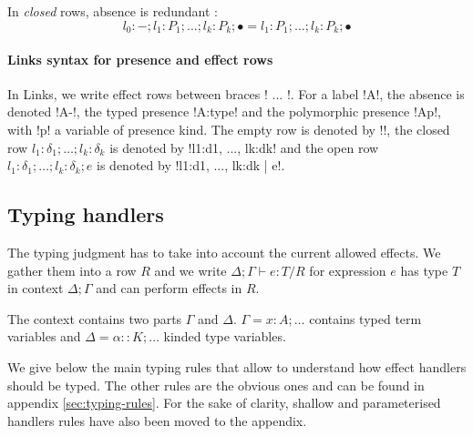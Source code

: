 \documentclass[11pt, nonacm=true, language=french, language=english]{acmart}
\begin{document}
\begin{rem}
  In \emph{closed} rows, absence is redundant :
  $$ l_{0}:- ; l_{1}:P_{1} ; \dots ; l_{k}:P_{k} ; \bullet = l_{1}:P_{1} ; \dots ; l_{k} : P_{k} ; \bullet $$
\end{rem}

\paragraph{Links syntax for presence and effect rows}
In Links, we write effect rows between braces !{ ... }!. For a label !A!, the absence is denoted !A-!, the typed presence !A:type! and the polymorphic presence !A{p}!, with !p! a variable of presence kind. The empty row is denoted by !{}!, the closed row $l_{1}:\delta_{1}; \dots; l_{k}:\delta_{k}$ is denoted by !{l1:d1, ..., lk:dk}! and the open row $l_{1}:\delta_{1}; \dots; l_{k}:\delta_{k}; e$ is denoted by !{l1:d1, ..., lk:dk | e}!.

\subsection{Typing handlers}
\label{sec:typing-handlers}

The typing judgment has to take into account the current allowed effects. We gather them into a row $R$ and we write $\Delta;\Gamma \vdash e : T / R$ for expression $e$ has type $T$ in context $\Delta;\Gamma$ and can perform effects in $R$.

\begin{rem}
  The context contains two parts $\Gamma$ and $\Delta$. $\Gamma = x : A ; \dots$ contains typed term variables and $\Delta = \alpha :: K; \dots$ kinded type variables.
\end{rem}

We give below the main typing rules that allow to understand how effect handlers should be typed. The other rules are the obvious ones and can be found in appendix \ref{sec:typing-rules}. For the sake of clarity, shallow and parameterised handlers rules have also been moved to the appendix.

\begin{prooftree}
\end{prooftree}

\begin{prooftree}
\end{prooftree}
\end{document}
